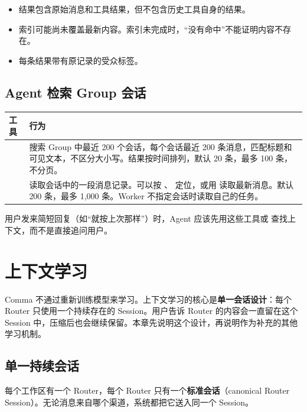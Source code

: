 \documentclass[UTF8,a4paper,11pt]{ctexart}
\begin{document}
\begin{itemize}
  \item 结果包含原始消息和工具结果，但不包含历史工具自身的结果。
  \item 索引可能尚未覆盖最新内容。索引未完成时，“没有命中”不能证明内容不存在。
  \item 每条结果带有原记录的受众标签。
\end{itemize}

\subsection{Agent 检索 Group 会话}

\begin{longtable}{P{4.6cm}P{9.2cm}}
\toprule
工具 & 行为 \\
\midrule
\endhead
{} & 搜索 Group 中最近 200 个会话，每个会话最近 200 条消息，匹配标题和可见文本，不区分大小写。结果按时间排列，默认 20 条，最多 100 条，不分页。 \\
 & 读取会话中的一段消息记录。可以按 、 定位，或用  读取最新消息。默认 200 条，最多 1,000 条。Worker 不指定会话时读取自己的任务。 \\
\bottomrule
\end{longtable}

用户发来简短回复（如“就按上次那样”）时，Agent 应该先用这些工具或  查找上下文，而不是直接追问用户。

\section{上下文学习}

Comma 不通过重新训练模型来学习。上下文学习的核心是\textbf{单一会话设计}：每个 Router 只使用一个持续存在的 Session。用户告诉 Router 的内容会一直留在这个 Session 中，压缩后也会继续保留。本章先说明这个设计，再说明作为补充的其他学习机制。

\subsection{单一持续会话}\label{sec:single-session}

每个工作区有一个 Router，每个 Router 只有一个\textbf{标准会话}（canonical Router Session）。无论消息来自哪个渠道，系统都把它送入同一个 Session。
\end{document}
